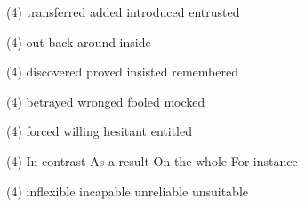 \item
\begin{tasks}(4)
	\task transferred
	\task added
	\task introduced
	\task entrusted
\end{tasks}
\item
\begin{tasks}(4)
	\task out
	\task back
	\task around
	\task inside
\end{tasks}
\item
\begin{tasks}(4)
	\task discovered
	\task proved
	\task insisted
	\task remembered
\end{tasks}
\item
\begin{tasks}(4)
	\task betrayed
	\task wronged
	\task fooled
	\task mocked
\end{tasks}
\item
\begin{tasks}(4)
	\task forced
	\task willing
	\task hesitant
	\task entitled
\end{tasks}
\item
\begin{tasks}(4)
	\task In contrast
	\task As a result
	\task On the whole
	\task For instance
\end{tasks}
\item
\begin{tasks}(4)
	\task inflexible
	\task incapable
	\task unreliable
	\task unsuitable
\end{tasks}